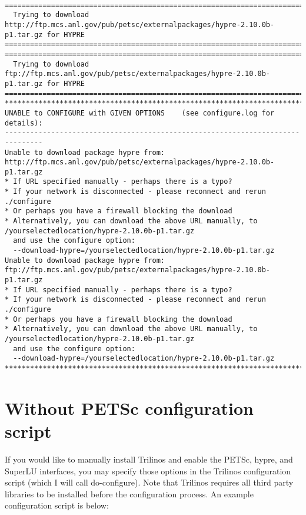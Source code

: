 {\tt \scriptsize
\begin{verbatim}
===============================================================================                                                                
  Trying to download http://ftp.mcs.anl.gov/pub/petsc/externalpackages/hypre-2.10.0b-p1.tar.gz for HYPRE 
=============================================================================== 
===============================================================================                                                                
  Trying to download ftp://ftp.mcs.anl.gov/pub/petsc/externalpackages/hypre-2.10.0b-p1.tar.gz for HYPRE 
===============================================================================                                                                                                                                                                                                   ******************************************************************************* UNABLE to CONFIGURE with GIVEN OPTIONS    (see configure.log for details):
-------------------------------------------------------------------------------
Unable to download package hypre from: http://ftp.mcs.anl.gov/pub/petsc/externalpackages/hypre-2.10.0b-p1.tar.gz
* If URL specified manually - perhaps there is a typo?
* If your network is disconnected - please reconnect and rerun ./configure
* Or perhaps you have a firewall blocking the download
* Alternatively, you can download the above URL manually, to /yourselectedlocation/hypre-2.10.0b-p1.tar.gz
  and use the configure option:
  --download-hypre=/yourselectedlocation/hypre-2.10.0b-p1.tar.gz
Unable to download package hypre from: ftp://ftp.mcs.anl.gov/pub/petsc/externalpackages/hypre-2.10.0b-p1.tar.gz
* If URL specified manually - perhaps there is a typo?
* If your network is disconnected - please reconnect and rerun ./configure
* Or perhaps you have a firewall blocking the download
* Alternatively, you can download the above URL manually, to /yourselectedlocation/hypre-2.10.0b-p1.tar.gz
  and use the configure option:
  --download-hypre=/yourselectedlocation/hypre-2.10.0b-p1.tar.gz
*******************************************************************************
\end{verbatim}
}

\section{Without PETSc configuration script}
If you would like to manually install Trilinos and enable the PETSc, hypre, and
SuperLU interfaces, you may specify those options in the Trilinos configuration
script (which I will call do-configure).  Note that Trilinos requires all third
party libraries to be installed before the configuration process.  An example
configuration script is below:

